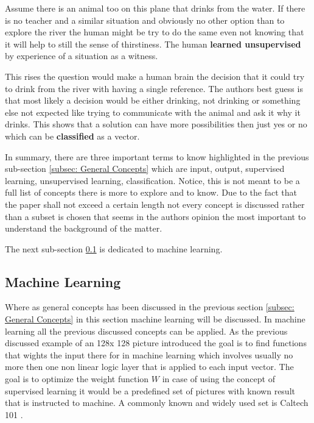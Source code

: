 \documentclass[conference]{IEEEtran}
\begin{document}
Assume there is an animal too on this plane that drinks from the water. If there is no teacher and a similar situation and obviously no other option than to explore the river the human might be try to do the same even not knowing that it will help to still the sense of thirstiness. The human \textbf{learned unsupervised} by experience of a situation as a witness.

This rises the question would make a human brain the decision that it could try to drink from the river with having a single reference. The authors best guess is that most likely a decision would be either drinking, not drinking or something else not expected like trying to communicate with the animal and ask it why it drinks. This shows that a solution can have more possibilities then just yes or no which can be \textbf{classified} as a vector. 

In summary, there are three important terms to know highlighted in the previous sub-section \ref{subsec: General Concepts} which are input, output, supervised learning, unsupervised learning, classification. Notice, this is not meant to be a full list of concepts there is more to explore and to know. Due to the fact that the paper shall not exceed a certain length not every concept is discussed rather than a subset is chosen that seems in the authors opinion the most important to understand the background of the matter. 

The next sub-section \ref{subsec: Machine Learning} is dedicated to machine learning. 

\subsection{Machine Learning}\label{subsec: Machine Learning}
Where as general concepts has been discussed in the previous section \ref{subsec: General Concepts} in this section machine learning will be discussed. In machine learning all the previous discussed concepts can be applied. As the previous discussed example of an 128x 128 picture introduced the goal is to find functions that wights the input there for in machine learning which involves usually no more then one non linear logic layer that is applied to each input vector. The goal is to optimize the weight function $W$ in case of using the concept of supervised learning it would be a predefined set of pictures with known result that is instructed to machine. A commonly known and widely used set is Caltech 101 \cite{Caltech101}. 
\end{document}
